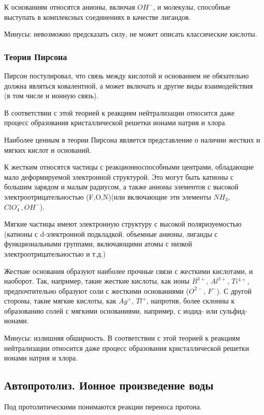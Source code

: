 \documentclass[14pt,a4paper]{scrartcl}
\begin{document}
 К основаниям относятся анионы, включая $OH^-$, и молекулы, способные выступать в комплексных  соединениях в качестве лигандов.
 
 Минусы: невозможно предсказать силу, не может описать классические кислоты.

\subsubsection{Теория Пирсона}

Пирсон постулировал, что связь между кислотой и основанием не обязательно должна являться ковалентной, а может включать и другие виды взаимодействия (в том числе и ионную связь).

В соответствии с этой теорией к реакциям нейтрализации относится даже процесс образования кристаллической решетки ионами натрия и хлора.

Наиболее ценным в теории Пирсона является представление о наличии жестких и мягких кислот и оснований. 

К жестким относятся частицы с реакционноспособными центрами, обладающие мало деформируемой электронной структурой. Это могут быть катионы с большим зарядом и малым радиусом, а также анионы элементов с высокой электроотрицательностью (F,O,N)(или включающие эти элементы $NH_3$, $ClO_4^-, OH^-$).

Мягкие частицы имеют электронную структуру с высокой поляризуемостью (катионы с d-электронной подкладкой. объемные анионы, лиганды с функциональными группами, включающими атомы с низкой электроотрицательностью и т.д.)

Жесткие основания образуют наиболее прочные связи с жесткими кислотами, и наоборот. Так, например, такие жесткие кислоты, как ионы $B^{3+}$, $Al^{3+}$, $Ti^{4+}$, предпочтительно образуют соли с жесткими основаниями ($O^{2-}$, $F^-$). С другой стороны, такие мягкие кислоты, как $Ag^+$, $Tl^+$, напротив, более склонны к образованию солей с мягкими основаниями, например, с иодид- или сульфид-ионами.

Минусы: излишняя обширность. В соответствии с этой
теорией к реакциям нейтрализации относится
даже процесс образования кристаллической
решетки ионами натрия и хлора.

\subsection{Автопротолиз. Ионное произведение воды}

Под протолитическими понимаются реакции переноса протона.
\end{document}
